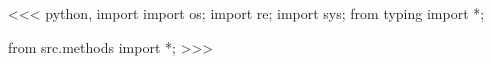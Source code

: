 <<< python, import
import os;
import re;
import sys;
from typing import *;

from src.methods import *;
>>>
